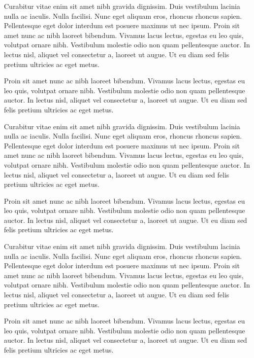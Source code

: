 Curabitur vitae enim sit amet nibh gravida dignissim. Duis vestibulum lacinia nulla ac iaculis. Nulla facilisi. Nunc eget aliquam eros, rhoncus rhoncus sapien. Pellentesque eget dolor interdum est posuere maximus ut nec ipsum. Proin sit amet nunc ac nibh laoreet bibendum. Vivamus lacus lectus, egestas eu leo quis, volutpat ornare nibh. Vestibulum molestie odio non quam pellentesque auctor. In lectus nisl, aliquet vel consectetur a, laoreet ut augue. Ut eu diam sed felis pretium ultricies ac eget metus.

Proin sit amet nunc ac nibh laoreet bibendum. Vivamus lacus lectus, egestas eu leo quis, volutpat ornare nibh. Vestibulum molestie odio non quam pellentesque auctor. In lectus nisl, aliquet vel consectetur a, laoreet ut augue. Ut eu diam sed felis pretium ultricies ac eget metus.


Curabitur vitae enim sit amet nibh gravida dignissim. Duis vestibulum lacinia nulla ac iaculis. Nulla facilisi. Nunc eget aliquam eros, rhoncus rhoncus sapien. Pellentesque eget dolor interdum est posuere maximus ut nec ipsum. Proin sit amet nunc ac nibh laoreet bibendum. Vivamus lacus lectus, egestas eu leo quis, volutpat ornare nibh. Vestibulum molestie odio non quam pellentesque auctor. In lectus nisl, aliquet vel consectetur a, laoreet ut augue. Ut eu diam sed felis pretium ultricies ac eget metus.

Proin sit amet nunc ac nibh laoreet bibendum. Vivamus lacus lectus, egestas eu leo quis, volutpat ornare nibh. Vestibulum molestie odio non quam pellentesque auctor. In lectus nisl, aliquet vel consectetur a, laoreet ut augue. Ut eu diam sed felis pretium ultricies ac eget metus.


Curabitur vitae enim sit amet nibh gravida dignissim. Duis vestibulum lacinia nulla ac iaculis. Nulla facilisi. Nunc eget aliquam eros, rhoncus rhoncus sapien. Pellentesque eget dolor interdum est posuere maximus ut nec ipsum. Proin sit amet nunc ac nibh laoreet bibendum. Vivamus lacus lectus, egestas eu leo quis, volutpat ornare nibh. Vestibulum molestie odio non quam pellentesque auctor. In lectus nisl, aliquet vel consectetur a, laoreet ut augue. Ut eu diam sed felis pretium ultricies ac eget metus.

Proin sit amet nunc ac nibh laoreet bibendum. Vivamus lacus lectus, egestas eu leo quis, volutpat ornare nibh. Vestibulum molestie odio non quam pellentesque auctor. In lectus nisl, aliquet vel consectetur a, laoreet ut augue. Ut eu diam sed felis pretium ultricies ac eget metus.

